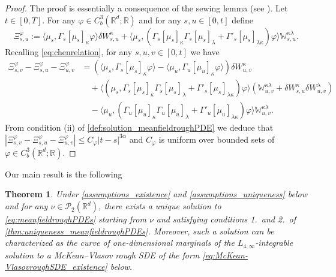 \documentclass[10pt, a4paper]{article} %
\newcommand{\R}{\mathbb{R}}
\theoremstyle{definition}
\theoremstyle{plain}
\newtheorem{thm}[defn]{Theorem}
\begin{document}
\begin{proof}
    The proof is essentially a consequence of the sewing lemma (see \cite[Lemma 4.2]{FRIZHAIRER}). 
    Let $t \in [0,T]$. For any $\varphi \in C^3_b(\R^d;\R)$ and for any $s,u \in [0,t]$ define \begin{equation*}
        \Xi_{s,u}^\varphi := \langle \mu_s, \Gamma_s[\mu_s]_\kappa \varphi  \rangle \delta W^\kappa_{s,u}  + \langle \mu_s, (\Gamma_s[\mu_s]_\kappa \Gamma_s[\mu_s]_\lambda + \Gamma'_s[\mu_s]_{\lambda \kappa}) \varphi  \rangle \mathbb{W}^{\kappa\lambda}_{s,u}. 
    \end{equation*}
    Recalling \eqref{eq:chenrelation}, for any $s,u,v \in [0,t]$ we have \begin{align*}
        \Xi_{s,v}^\varphi - \Xi_{s,u}^\varphi - \Xi_{u,v}^\varphi &= (\langle \mu_s, \Gamma_s[\mu_s]_\kappa \varphi  \rangle - \langle \mu_u, \Gamma_u[\mu_u]_\kappa \varphi  \rangle) \delta W^\kappa_{u,v}  \\
        & \quad + \langle (\mu_s, \Gamma_s[\mu_s]_\kappa \Gamma_s[\mu_s]_\lambda + \Gamma'_s[\mu_s]_{\lambda \kappa}) \varphi \rangle (\mathbb{W}^{\kappa\lambda}_{u,v} + \delta W^\kappa_{s,u} \delta{W}^\lambda_{u,v})  \\
        & \quad - \langle \mu_u,  (\Gamma_u[\mu_u]_\kappa \Gamma_u[\mu_u]_\lambda + \Gamma'_u[\mu_u]_{\lambda \kappa})\varphi \rangle \mathbb{W}^{\kappa\lambda}_{u,v}.  
    \end{align*}
        From condition (ii) of \cref{def:solution_meanfieldroughPDE} we deduce that $|\Xi_{s,v}^\varphi - \Xi_{s,u}^\varphi - \Xi_{u,v}^\varphi| \le C_\varphi |t-s|^{3\alpha}$ and $C_\varphi$ is uniform over bounded sets of $\varphi \in C^3_b(\R^d;\R)$. 
\end{proof}

 Our main result is the following

\begin{thm} \label{thm:mainresult}
    Under \cref{assumptions_existence} and \cref{assumptions_uniqueness} below and for any $\nu \in \mathcal{P}_2(\R^d)$, there exists a unique solution to \eqref{eq:meanfieldroughPDEs} starting from $\nu$ {and satisfying conditions 1.\ and 2.\ of \cref{thm:uniqueness_meanfieldroughPDEs}}. 
    Moreover, such a solution can be characterized as the curve of one-dimensional marginals of the $L_{4,\infty}$-integrable solution to a McKean--Vlasov rough SDE of the form \eqref{eq:McKean-VlasovroughSDE_existence} below. 
\end{thm}
\end{document}
